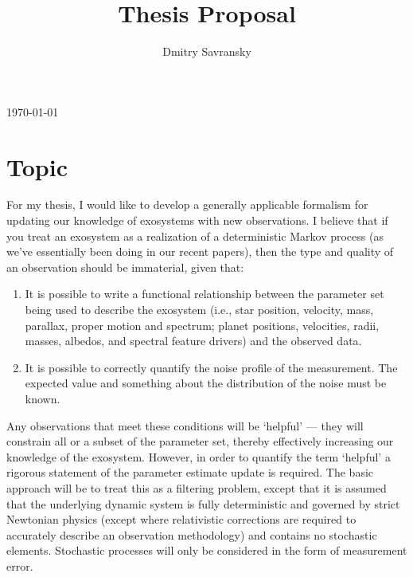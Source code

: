 \documentclass[oneside,11pt]{amsart}
\title{Thesis Proposal}
\author{Dmitry Savransky}
\begin{document}
\vspace{-2ex}
\maketitle
\vspace{-2ex}
\begin{center}\today\end{center}
\section{Topic}
For my thesis, I would like to develop a generally applicable formalism for updating our knowledge of exosystems with new observations.  I believe that if you treat an exosystem as a realization of a deterministic Markov process (as we've essentially been doing in our recent papers), then the type and quality of an observation should be immaterial, given that:
\begin{enumerate}
\item It is possible to write a functional relationship between the parameter set being used to describe the exosystem (i.e., star position, velocity, mass, parallax, proper motion and spectrum; planet positions, velocities, radii, masses, albedos, and spectral feature drivers) and the observed data.
\item It is possible to correctly quantify the noise profile of the measurement.  The expected value and something about the distribution of the noise must be known.
\end{enumerate}
Any observations that meet these conditions will be `helpful' --- they will constrain all or a subset of the parameter set, thereby effectively increasing our knowledge of the exosystem.  However, in order to quantify the term `helpful' a rigorous statement of the parameter estimate update is required.  The basic approach will be to treat this as a filtering problem, except that it is assumed that the underlying dynamic system is fully deterministic and governed by strict Newtonian physics (except where relativistic corrections are required to accurately describe an observation methodology) and contains no stochastic elements.  Stochastic processes will only be considered in the form of measurement error.
\end{document}
